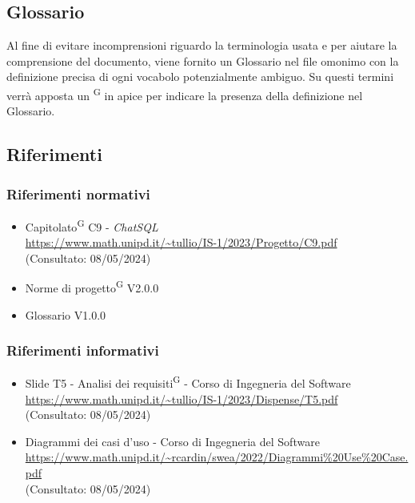 \subsection{Glossario}
Al fine di evitare incomprensioni riguardo la terminologia usata e per aiutare la comprensione del documento, viene fornito un Glossario nel file omonimo con la definizione precisa di ogni vocabolo potenzialmente ambiguo. Su questi termini verrà apposta un \textsuperscript{G} in apice per indicare la presenza della definizione nel Glossario.

\subsection{Riferimenti}
\subsubsection{Riferimenti normativi}
\begin{itemize}
	\item Capitolato\textsuperscript{G} C9 - \textit{ChatSQL} \\ \url{https://www.math.unipd.it/~tullio/IS-1/2023/Progetto/C9.pdf} \\ (Consultato: 08/05/2024)
	\item Norme di progetto\textsuperscript{G} V2.0.0 
	\item Glossario V1.0.0
\end{itemize}

\subsubsection{Riferimenti informativi}
\begin{itemize}
	\item Slide T5 - Analisi dei requisiti\textsuperscript{G} - Corso di Ingegneria del Software \\ \url{https://www.math.unipd.it/~tullio/IS-1/2023/Dispense/T5.pdf} \\ (Consultato: 08/05/2024)
	\item Diagrammi dei casi d'uso - Corso di Ingegneria del Software \\ \url{https://www.math.unipd.it/~rcardin/swea/2022/Diagrammi%20Use%20Case.pdf} \\ (Consultato: 08/05/2024)
\end{itemize}